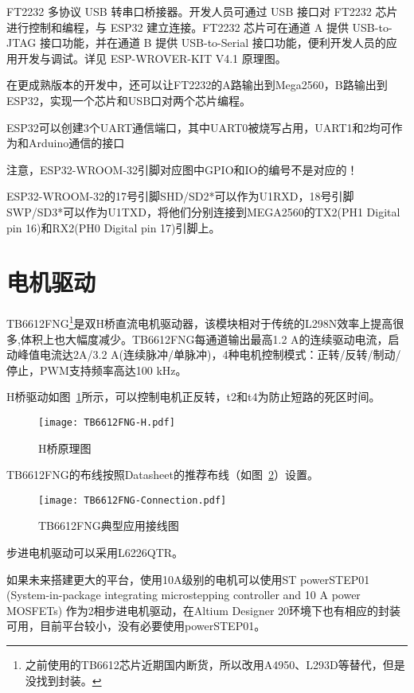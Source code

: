 FT2232 多协议 USB 转串口桥接器。开发人员可通过 USB 接口对 FT2232 芯片进行控制和编程，与 ESP32 建立连接。FT2232 芯片可在通道 A 提供 USB-to-JTAG 接口功能，并在通道 B 提供 USB-to-Serial 接口功能，便利开发人员的应用开发与调试。详见 ESP-WROVER-KIT V4.1 原理图。

在更成熟版本的开发中，还可以让FT2232的A路输出到Mega2560，B路输出到ESP32，实现一个芯片和USB口对两个芯片编程。

ESP32可以创建3个UART通信端口，其中UART0被烧写占用，UART1和2均可作为和Arduino通信的接口

注意，ESP32-WROOM-32引脚对应图中GPIO和IO的编号不是对应的！

ESP32-WROOM-32的17号引脚SHD/SD2*可以作为U1RXD，18号引脚SWP/SD3*可以作为U1TXD，将他们分别连接到MEGA2560的TX2(PH1 Digital pin 16)和RX2(PH0 Digital pin 17)引脚上。


\section{电机驱动}

TB6612FNG\footnote{之前使用的TB6612芯片近期国内断货，所以改用A4950、L293D等替代，但是没找到封装。}是双H桥直流电机驱动器，该模块相对于传统的L298N效率上提高很多,体积上也大幅度减少。TB6612FNG每通道输出最高1.2 A的连续驱动电流，启动峰值电流达2A/3.2 A(连续脉冲/单脉冲)，4种电机控制模式：正转/反转/制动/停止，PWM支持频率高达100 kHz。

H桥驱动如图~\ref{fig:TB6612FNG-H}所示，可以控制电机正反转，t2和t4为防止短路的死区时间。

\begin{figure}[htbp]
    \centering
    \texttt{[image: TB6612FNG-H.pdf]}
    \caption{H桥原理图}
    \label{fig:TB6612FNG-H}
\end{figure}

TB6612FNG的布线按照Datasheet的推荐布线（如图~\ref{fig:TB6612FNG-Connection}）设置。

\begin{figure}[htbp]
    \centering
    \texttt{[image: TB6612FNG-Connection.pdf]}
    \caption{TB6612FNG典型应用接线图}
    \label{fig:TB6612FNG-Connection}
\end{figure}

步进电机驱动可以采用L6226QTR。

如果未来搭建更大的平台，使用10A级别的电机可以使用ST powerSTEP01 (System-in-package integrating microstepping controller and
10 A power MOSFETs) 作为2相步进电机驱动，在Altium Designer 20环境下也有相应的封装可用，目前平台较小，没有必要使用powerSTEP01。

